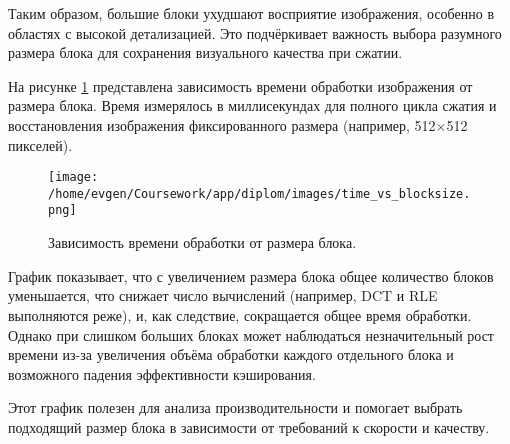 Таким образом, большие блоки ухудшают восприятие изображения, особенно в областях с высокой детализацией. 
Это подчёркивает важность выбора разумного размера блока для сохранения визуального качества при сжатии.


На рисунке \ref{fig:time_vs_blocksize} представлена зависимость времени обработки изображения от размера блока. 
Время измерялось в миллисекундах для полного цикла сжатия и восстановления изображения фиксированного 
размера (например, 512×512 пикселей).

\begin{figure}[H]
    \centering
    \texttt{[image: /home/evgen/Coursework/app/diplom/images/time\_vs\_blocksize.png]}
    \caption{Зависимость времени обработки от размера блока.}
    \label{fig:time_vs_blocksize}
\end{figure}

График показывает, что с увеличением размера блока общее количество блоков уменьшается, 
что снижает число вычислений (например, DCT и RLE выполняются реже), и, как следствие, 
сокращается общее время обработки. 
Однако при слишком больших блоках может наблюдаться незначительный рост времени из-за увеличения объёма 
обработки каждого отдельного блока и возможного падения эффективности кэширования.

Этот график полезен для анализа производительности и помогает выбрать подходящий размер блока в 
зависимости от требований к скорости и качеству.